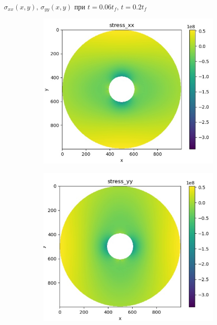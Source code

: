 \documentclass{beamer}
\begin{document}
	\begin{frame}{$\sigma_{xx}(x,y),\,\sigma_{yy}(x,y)$ при $t = 0.06t_f,\,t=0.2t_f$}
\begin{figure}[H]
\centering
\begin{subfigure}[H]{0.4\textwidth}
	\includegraphics[width=\textwidth]{stressx_06tf}
\end{subfigure}
\qquad\qquad
\begin{subfigure}[H]{0.4\textwidth}
	\includegraphics[width=\textwidth]{stressy_06tf}

\end{subfigure}
\end{figure}
\end{frame}
\end{document}
